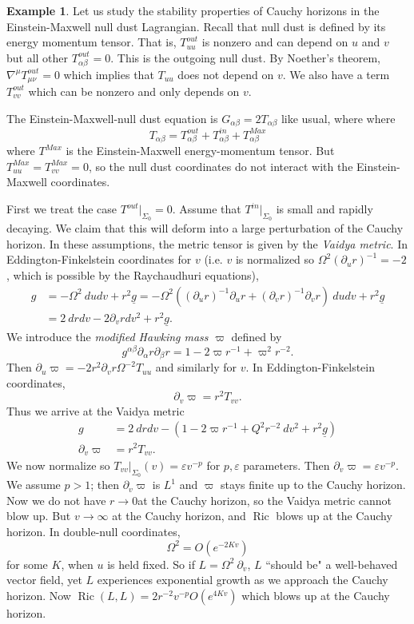 \documentclass[12pt]{report}
\newcommand{\Ric}{\operatorname{Ric}}
\newcommand{\dfn}[1]{\emph{#1}\index{#1}}
\theoremstyle{definition}
\newtheorem{example}[theorem]{Example}
\begin{document}
\begin{example}
    Let us study the stability properties of Cauchy horizons in the Einstein-Maxwell null dust Lagrangian. Recall that null dust is defined by its energy momentum tensor. That is, $T_{uu}^{out}$ is nonzero and can depend on $u$ and $v$ but all other $T_{\alpha\beta}^{out} = 0$. This is the outgoing null dust. By Noether's theorem, $\nabla^\mu T_{\mu\nu}^{out} = 0$ which implies that $T_{uu}$ does not depend on $v$. We also have a term $T_{vv}^{out}$ which can be nonzero and only depends on $v$.

    The Einstein-Maxwell-null dust equation is $G_{\alpha\beta} = 2T_{\alpha\beta}$ like usual, where
    where
    $$T_{\alpha\beta} = T^{out}_{\alpha\beta} + T^{in}_{\alpha\beta} + T_{\alpha\beta}^{Max}$$
    where $T^{Max}$ is the Einstein-Maxwell energy-momentum tensor. But $T_{uu}^{Max} = T_{vv}^{Max} = 0$, so the null dust coordinates do not interact with the Einstein-Maxwell coordinates.

    First we treat the case $T^{out}|_{\Sigma_0} = 0$. Assume that $T^{in}|_{\Sigma_0}$ is small and rapidly decaying. We claim that this will deform into a large perturbation of the Cauchy horizon. In these assumptions, the metric tensor is given by the \dfn{Vaidya metric}. In Eddington-Finkelstein coordinates for $v$ (i.e. $v$ is normalized so $\Omega^2(\partial_ur)^{-1} = -2$, which is possible by the Raychaudhuri equations),
\begin{align*}
    g &= -\Omega^2 ~dudv + r^2\underline g = -\Omega^2((\partial_ur)^{-1} \partial_ur + (\partial_vr)^{-1} \partial_vr) ~dudv + r^2\underline g\\
        &= 2~drdv - 2\partial_vr dv^2 + r^2\underline g.
\end{align*}
    We introduce the \dfn{modified Hawking mass} $\varpi$ defined by
    $$g^{\alpha\beta} \partial_\alpha r \partial_\beta r = 1 -2\varpi r^{-1} + \varpi^2 r^{-2}.$$
    Then $\partial_u\varpi = -2r^2 \partial_vr\Omega^{-2} T_{uu}$ and similarly for $v$. In Eddington-Finkelstein coordinates,
    $$\partial_v \varpi = r^2 T_{vv}.$$
    Thus we arrive at the Vaidya metric
\begin{align*}
    g &= 2~drdv - (1 - 2\varpi r^{-1} + Q^2r^{-2} ~dv^2 + r^2\underline g)\\
    \partial_v\varpi &= r^2T_{vv}.
\end{align*}
    We now normalize so $T_{vv}|_{\Sigma_0}(v) = \varepsilon v^{-p}$ for $p,\varepsilon$ parameters. Then $\partial_v \varpi = \varepsilon v^{-p}$. We assume $p > 1$; then $\partial_v \varpi$ is $L^1$ and $\varpi$ stays finite up to the Cauchy horizon. Now we do not have $r \to 0$at the Cauchy horizon, so the Vaidya metric cannot blow up. But $v \to \infty$ at the Cauchy horizon, and $\Ric$ blows up at the Cauchy horizon. In double-null coordinates,
    $$\Omega^2 = O(e^{-2Kv})$$
    for some $K$, when $u$ is held fixed. So if $L = \Omega^2 ~\partial_v$, $L$ ``should be" a well-behaved vector field, yet $L$ experiences exponential growth as we approach the Cauchy horizon. Now $\Ric(L, L) = 2r^{-2}v^{-p} O(e^{4Kv})$ which blows up at the Cauchy horizon.


\end{example}
\end{document}
